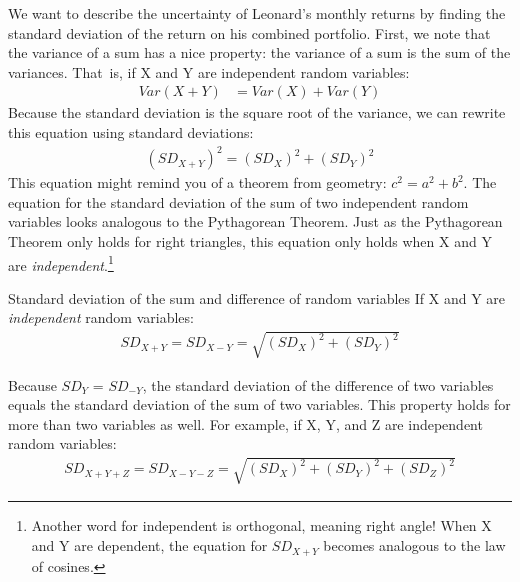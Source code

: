 We want to describe the uncertainty of Leonard's monthly returns by finding the standard deviation of the return on his combined portfolio. First, we note that the variance of a sum has a nice property: the variance of a sum is the sum of the variances. That~is, if X and Y are independent random variables:
\begin{align*}
Var(X + Y) &= Var(X) + Var(Y)
\end{align*}
Because the standard deviation is the square root of the variance, we can rewrite this equation using standard deviations:
\begin{align*}
(SD_{X + Y})^2 = (SD_X)^2 + (SD_Y)^2
\end{align*}
This equation might remind you of a theorem from geometry:  $c^2 = a^2 + b^2$. The equation for the standard deviation of the sum of two independent random variables looks analogous to the Pythagorean Theorem. Just as the Pythagorean Theorem only holds for right triangles, this equation only holds when X and Y are \emph{independent}.\footnote{Another word for independent is orthogonal, meaning right angle!  When X and Y are dependent, the equation for $SD_{X+Y}$ becomes analogous to the law of cosines.}

\begin{onebox}{Standard deviation of the sum and difference of random variables}
If X and Y are \emph{independent} random variables:
\begin{align*}
SD_{X + Y} = SD_{X - Y} = \sqrt{(SD_X)^2 + (SD_Y)^2}
\end{align*}
\end{onebox}

Because $SD_Y$ = $SD_{-Y}$, the standard deviation of the difference of two variables equals the standard deviation of the sum of two variables. This property holds for more than two variables as well. For example, if X, Y, and Z are independent random variables:
\begin{align*}
SD_{X + Y + Z} = SD_{X - Y - Z}  = \sqrt{(SD_X)^2 + (SD_Y)^2 + (SD_Z)^2}
\end{align*}


